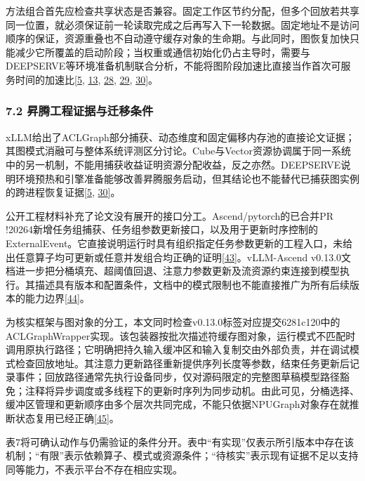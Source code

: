 \documentclass[UTF8,11pt,fontset=windows]{ctexart}
\begin{document}
方法组合首先应检查共享状态是否兼容。固定工作区节约分配，但多个回放若共享同一位置，就必须保证前一轮读取完成之后再写入下一轮数据。固定地址不是访问顺序的保证，资源重叠也不自动遵守缓存对象的生命期。与此同时，图恢复加快只能减少它所覆盖的启动阶段；当权重或通信初始化仍占主导时，需要与DEEPSERVE等环境准备机制联合分析，不能将图阶段加速比直接当作首次可服务时间的加速比\protect\hyperlink{ref-5}{{[}5}, \protect\hyperlink{ref-13}{13}, \protect\hyperlink{ref-28}{28}, \protect\hyperlink{ref-29}{29}, \protect\hyperlink{ref-30}{30{]}}。

\hypertarget{section-7-2}{%
\subsubsection{7.2 昇腾工程证据与迁移条件}\label{section-7-2}}

xLLM给出了ACLGraph部分捕获、动态维度和固定偏移内存池的直接论文证据；其图模式消融可与整体系统评测区分讨论。Cube与Vector资源协调属于同一系统中的另一机制，不能用捕获收益证明资源分配收益，反之亦然。DEEPSERVE说明环境预热和引擎准备能够改善昇腾服务启动，但其结论也不能替代已捕获图实例的跨进程恢复证据\protect\hyperlink{ref-5}{{[}5}, \protect\hyperlink{ref-30}{30{]}}。

公开工程材料补充了论文没有展开的接口分工。Ascend/pytorch的已合并PR !20264新增任务组捕获、任务组参数更新接口，以及用于更新时序控制的ExternalEvent。它直接说明运行时具有组织指定任务参数更新的工程入口，未给出任意算子均可更新或任意并发组合均正确的证明\protect\hyperlink{ref-43}{{[}43{]}}。vLLM-Ascend v0.13.0文档进一步把分桶填充、超阈值回退、注意力参数更新及流资源约束连接到模型执行。其描述具有版本和配置条件，文档中的模式限制也不能直接推广为所有后续版本的能力边界\protect\hyperlink{ref-44}{{[}44{]}}。

为核实框架与图对象的分工，本文同时检查v0.13.0标签对应提交6281c120中的ACLGraphWrapper实现。该包装器按批次描述符缓存图对象，运行模式不匹配时调用原执行路径；它明确把持久输入缓冲区和输入复制交由外部负责，并在调试模式检查回放地址。其注意力更新路径重新提供序列长度等参数，结束任务更新后记录事件；回放路径通常先执行设备同步，仅对源码限定的完整图草稿模型路径豁免；注释将异步调度或多线程下的更新时序列为同步动机。由此可见，分桶选择、缓冲区管理和更新顺序由多个层次共同完成，不能只依据NPUGraph对象存在就推断状态复用已经正确\protect\hyperlink{ref-45}{{[}45{]}}。

表7将可确认动作与仍需验证的条件分开。表中``有实现''仅表示所引版本中存在该机制；``有限''表示依赖算子、模式或资源条件；``待核实''表示现有证据不足以支持同等能力，不表示平台不存在相应实现。
\end{document}
